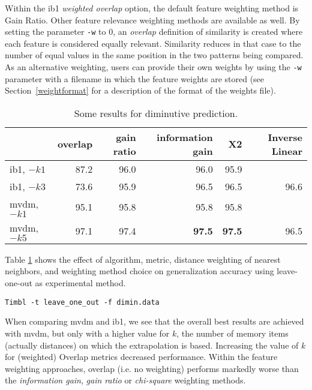 \documentclass{report}
\begin{document}
Within the {\sc ib1} {\em weighted overlap} option, the default
feature weighting method is Gain Ratio. Other feature relevance
weighting methods are available as well.  By setting the parameter
{\tt -w} to 0, an {\em overlap} definition of similarity is created
where each feature is considered equally relevant. Similarity reduces
in that case to the number of equal values in the same position in the
two patterns being compared. As an alternative weighting, users can
provide their own weights by using the {\tt -w} parameter with a
filename in which the feature weights are stored (see
Section~\ref{weightformat} for a description of the format of the
weights file).

\begin{table}
\begin{center}
\begin{tabular}{|l|r|r|r|r|r|}\hline
             & overlap & gain ratio & information gain & X2 & Inverse Linear\\
\hline
{\sc ib1}, $-k1$ & 87.2 & 96.0 & 96.0 & 95.9 & \\
{\sc ib1}, $-k3$ & 73.6 & 95.9 & 96.5 & 96.5 & 96.6 \\
{\sc mvdm}, $-k1$ & 95.1  & 95.8 & 95.8 & 95.8 & \\
{\sc mvdm}, $-k5$ & 97.1 & 97.4 & {\bf 97.5} & {\bf 97.5} & 96.5\\
\hline
\end{tabular}
\caption{Some results for diminutive prediction.}
\label{diminresults}
\end{center}
\end{table}

Table \ref{diminresults} shows the effect of algorithm, metric,
distance weighting of nearest neighbors, and weighting method choice
on generalization accuracy using leave-one-out as experimental method.

{\small
\begin{verbatim}
Timbl -t leave_one_out -f dimin.data
\end{verbatim}
}

When comparing {\sc mvdm} and {\sc ib1}, we see that the overall best
results are achieved with {\sc mvdm}, but only with a higher value for
$k$, the number of memory items (actually distances) on which the
extrapolation is based. Increasing the value of $k$ for (weighted)
Overlap metrics decreased performance. Within the feature weighting
approaches, overlap (i.e. no weighting) performs markedly worse than
the {\em information gain}, {\em gain ratio} or {\em
chi-square} weighting methods. 
\end{document}
